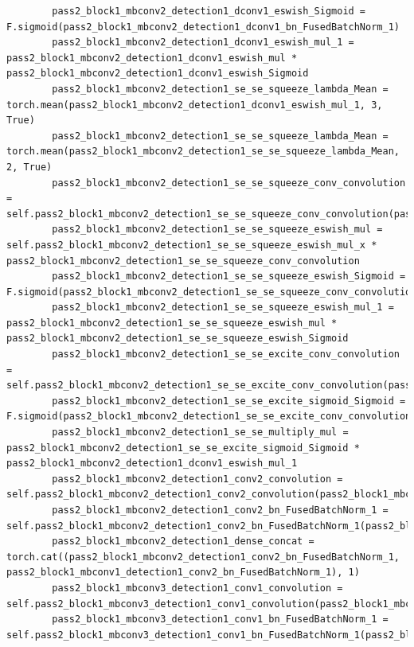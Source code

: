 \documentclass{fisatprojectfinal}
\begin{document}
\begin{appendices}
\begin{lstlisting}
        pass2_block1_mbconv2_detection1_dconv1_eswish_Sigmoid = F.sigmoid(pass2_block1_mbconv2_detection1_dconv1_bn_FusedBatchNorm_1)
        pass2_block1_mbconv2_detection1_dconv1_eswish_mul_1 = pass2_block1_mbconv2_detection1_dconv1_eswish_mul * pass2_block1_mbconv2_detection1_dconv1_eswish_Sigmoid
        pass2_block1_mbconv2_detection1_se_se_squeeze_lambda_Mean = torch.mean(pass2_block1_mbconv2_detection1_dconv1_eswish_mul_1, 3, True)
        pass2_block1_mbconv2_detection1_se_se_squeeze_lambda_Mean = torch.mean(pass2_block1_mbconv2_detection1_se_se_squeeze_lambda_Mean, 2, True)
        pass2_block1_mbconv2_detection1_se_se_squeeze_conv_convolution = self.pass2_block1_mbconv2_detection1_se_se_squeeze_conv_convolution(pass2_block1_mbconv2_detection1_se_se_squeeze_lambda_Mean)
        pass2_block1_mbconv2_detection1_se_se_squeeze_eswish_mul = self.pass2_block1_mbconv2_detection1_se_se_squeeze_eswish_mul_x * pass2_block1_mbconv2_detection1_se_se_squeeze_conv_convolution
        pass2_block1_mbconv2_detection1_se_se_squeeze_eswish_Sigmoid = F.sigmoid(pass2_block1_mbconv2_detection1_se_se_squeeze_conv_convolution)
        pass2_block1_mbconv2_detection1_se_se_squeeze_eswish_mul_1 = pass2_block1_mbconv2_detection1_se_se_squeeze_eswish_mul * pass2_block1_mbconv2_detection1_se_se_squeeze_eswish_Sigmoid
        pass2_block1_mbconv2_detection1_se_se_excite_conv_convolution = self.pass2_block1_mbconv2_detection1_se_se_excite_conv_convolution(pass2_block1_mbconv2_detection1_se_se_squeeze_eswish_mul_1)
        pass2_block1_mbconv2_detection1_se_se_excite_sigmoid_Sigmoid = F.sigmoid(pass2_block1_mbconv2_detection1_se_se_excite_conv_convolution)
        pass2_block1_mbconv2_detection1_se_se_multiply_mul = pass2_block1_mbconv2_detection1_se_se_excite_sigmoid_Sigmoid * pass2_block1_mbconv2_detection1_dconv1_eswish_mul_1
        pass2_block1_mbconv2_detection1_conv2_convolution = self.pass2_block1_mbconv2_detection1_conv2_convolution(pass2_block1_mbconv2_detection1_se_se_multiply_mul)
        pass2_block1_mbconv2_detection1_conv2_bn_FusedBatchNorm_1 = self.pass2_block1_mbconv2_detection1_conv2_bn_FusedBatchNorm_1(pass2_block1_mbconv2_detection1_conv2_convolution)
        pass2_block1_mbconv2_detection1_dense_concat = torch.cat((pass2_block1_mbconv2_detection1_conv2_bn_FusedBatchNorm_1, pass2_block1_mbconv1_detection1_conv2_bn_FusedBatchNorm_1), 1)
        pass2_block1_mbconv3_detection1_conv1_convolution = self.pass2_block1_mbconv3_detection1_conv1_convolution(pass2_block1_mbconv2_detection1_dense_concat)
        pass2_block1_mbconv3_detection1_conv1_bn_FusedBatchNorm_1 = self.pass2_block1_mbconv3_detection1_conv1_bn_FusedBatchNorm_1(pass2_block1_mbconv3_detection1_conv1_convolution)

\end{lstlisting}
\end{appendices}
\end{document}

